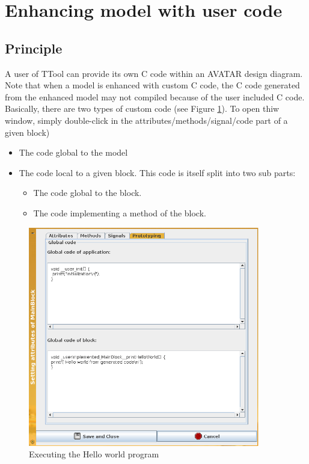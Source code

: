 \documentclass[12pt]{article}
\begin{document}
\newpage
\section{Enhancing model with user code}\label{sec:custom}

\subsection{Principle}
A user of TTool can provide its own C code within an AVATAR design diagram. Note that when a model is enhanced with custom C code, the C code generated from the enhanced model may not compiled because of the user included C code.\\
Basically, there are two types of custom code (see Figure \ref{fig:customhelloworld}). To open thiw window, simply double-click in the attributes/methods/signal/code part of a given block)
\begin{itemize}
\item The code global to the model
\item The code local to a given block. This code is itself split into two sub parts:
\begin{itemize}
\item The code global to the block.
\item The code implementing a method of the block.
\end{itemize}
\end{itemize}

\begin{figure}[htbp]
\centering
\includegraphics[width=0.9\textwidth]{figures/customhelloworld}
\caption{Executing the Hello world program} \label{fig:customhelloworld}
\end{figure}
\end{document}
